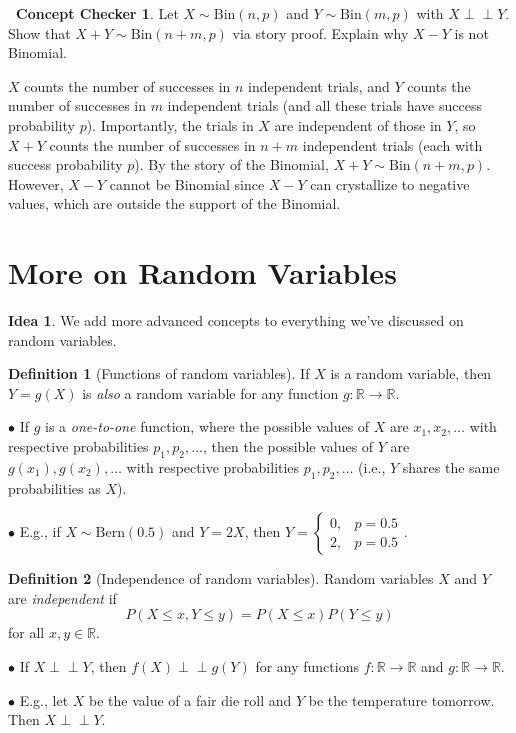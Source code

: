 \documentclass[12pt,oneside]{article}
\newcommand{\indep}{\perp\!\!\!\perp}
\newcommand{\Bern}{\text{Bern}}
\newcommand{\Bin}{\text{Bin}}
\newcommand{\R}{\mathbb{R}}
\theoremstyle{definition}
\newtheorem{definition}{Definition}
\newtheorem{concept}{\faPen \ Concept Checker}
\newtheorem*{idea}{Idea}
\theoremstyle{remark}
\begin{document}
\begin{concept}
Let $X \sim \Bin(n, p)$ and $Y \sim \Bin(m, p)$ with $X \indep Y$. Show that $X + Y \sim \Bin(n + m, p)$ via story proof. Explain why $X - Y$ is not Binomial.
\end{concept}

\begin{solutionbox}
$X$ counts the number of successes in $n$ independent trials, and $Y$ counts the number of successes in $m$ independent trials (and all these trials have success probability $p$). Importantly, the trials in $X$ are independent of those in $Y$, so $X + Y$ counts the number of successes in $n + m$ independent trials (each with success probability $p$). By the story of the Binomial, $X + Y \sim \Bin(n + m, p)$. However, $X - Y$ cannot be Binomial since $X - Y$ can crystallize to negative values, which are outside the support of the Binomial.
\end{solutionbox}

\section{More on Random Variables}

\begin{idea}
We add more advanced concepts to everything we've discussed on random variables.
\end{idea}

\begin{definition}[Functions of random variables]
If $X$ is a random variable, then $Y = g(X)$ is \textit{also} a random variable for any function $g: \R \rightarrow \R$.

$\bullet$ If $g$ is a \textit{one-to-one} function, where the possible values of $X$ are $x_1, x_2, \ldots$ with respective probabilities $p_1, p_2, \ldots$, then the possible values of $Y$ are $g(x_1), g(x_2), \ldots$ with respective probabilities  $p_1, p_2, \ldots$ (i.e., $Y$ shares the same probabilities as $X$).

$\bullet$ E.g., if $X \sim \Bern(0.5)$ and $Y = 2X$, then $Y =
\begin{cases} 
    0, & p = 0.5 \\
    2, & p = 0.5 
\end{cases}$.
\end{definition}

\begin{definition}[Independence of random variables]
Random variables $X$ and $Y$ are \textit{independent} if \[P(X \leq x, Y \leq y) = P(X \leq x) P(Y \leq y)\] for all $x, y \in \R$.

$\bullet$ If $X \indep Y$, then $f(X) \indep g(Y)$ for any functions $f: \R \rightarrow \R$ and $g: \R \rightarrow \R$.

$\bullet$ E.g., let $X$ be the value of a fair die roll and $Y$ be the temperature tomorrow. Then $X \indep Y$.
\end{definition}
\end{document}
